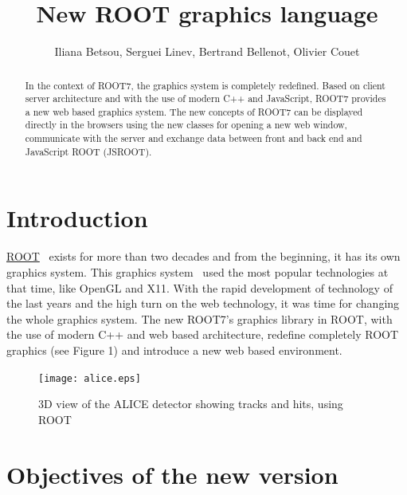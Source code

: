 \documentclass[a4paper]{jpconf}
\begin{document}
\title{New ROOT graphics language}

\author{Iliana Betsou, Serguei Linev, Bertrand Bellenot, Olivier Couet}

\address{Production Editor, \jpcs, \iopp, Dirac House, Temple Back, Bristol BS1~6BE, UK}


\begin{abstract}
In the context of ROOT7, the graphics system is completely redefined. Based on client
server architecture and with the use of modern C++ and JavaScript, ROOT7 provides a
new web based graphics system. The new concepts of ROOT7 can be displayed directly
in the browsers using the new classes for opening a new web window, communicate
with the server and exchange data between front and back end and JavaScript ROOT (JSROOT).
\end{abstract}

\section{Introduction}
\href{https://root.cern/}{ROOT}~\cite{root} exists for more than two decades and
from the beginning, it has its own graphics system. This graphics system~\cite{Antcheva:2011zz}
used the most popular technologies at that time, like OpenGL and X11. With the rapid development
of technology of the last years and the high turn on the web technology, it was time for
changing the whole graphics system. The new ROOT7's graphics library in ROOT, with the
use of modern C++ and web based architecture, redefine completely ROOT graphics (see Figure 1)
 and introduce a new web based environment.
\\
\begin{figure}[h]
  \begin{center}
    \texttt{[image: alice.eps]}\hspace{2pc}%
  \end{center}
\centering
\begin{minipage}[b]{25pc}\caption{\label{label}3D view of the ALICE detector showing tracks and hits, using ROOT}
\end{minipage}
\end{figure}


\section{Objectives of the new version}
\end{document}
